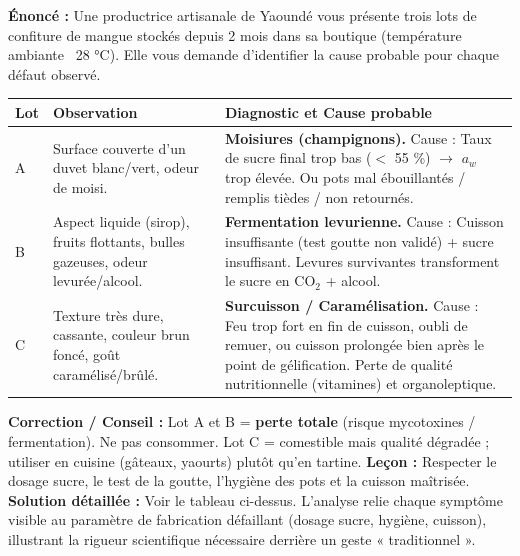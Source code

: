 \documentclass[11pt]{article}
\newcounter{popsec}
\newcounter{popsub}
\newcommand{\courssub}[1]{%
  \stepcounter{popsub}%
  \par\vspace{9pt}\noindent{\popxbold\fontsize{11.5}{13}\selectfont\color{popink}{\color{poporange}\thepopsec.\thepopsub}\hspace{6pt}#1}\par\nopagebreak\vspace{4pt}
}
\begin{document}
\begin{exoresolu}
\textbf{Énoncé :} Une productrice artisanale de Yaoundé vous présente trois lots de confiture de mangue stockés depuis 2 mois dans sa boutique (température ambiante ~28 °C). Elle vous demande d'identifier la cause probable pour chaque défaut observé.

\begin{center}
\begin{tabularx}{\linewidth}{|l|X|X|}\hline
\textbf{Lot} & \textbf{Observation} & \textbf{Diagnostic et Cause probable} \\ \hline
A & Surface couverte d'un duvet blanc/vert, odeur de moisi. & \textbf{Moisiures (champignons).} Cause : Taux de sucre final trop bas ($<$ 55 \%) $\rightarrow$ $a_w$ trop élevée. Ou pots mal ébouillantés / remplis tièdes / non retournés. \\ \hline
B & Aspect liquide (sirop), fruits flottants, bulles gazeuses, odeur levurée/alcool. & \textbf{Fermentation levurienne.} Cause : Cuisson insuffisante (test goutte non validé) + sucre insuffisant. Levures survivantes transforment le sucre en CO$_2$ + alcool. \\ \hline
C & Texture très dure, cassante, couleur brun foncé, goût caramélisé/brûlé. & \textbf{Surcuisson / Caramélisation.} Cause : Feu trop fort en fin de cuisson, oubli de remuer, ou cuisson prolongée bien après le point de gélification. Perte de qualité nutritionnelle (vitamines) et organoleptique. \\ \hline
\end{tabularx}
\end{center}

\textbf{Correction / Conseil :} Lot A et B = \textbf{perte totale} (risque mycotoxines / fermentation). Ne pas consommer. Lot C = comestible mais qualité dégradée ; utiliser en cuisine (gâteaux, yaourts) plutôt qu'en tartine. \textbf{Leçon :} Respecter le dosage sucre, le test de la goutte, l'hygiène des pots et la cuisson maîtrisée.
\tcblower
\textbf{Solution détaillée :}
Voir le tableau ci-dessus. L'analyse relie chaque symptôme visible au paramètre de fabrication défaillant (dosage sucre, hygiène, cuisson), illustrant la rigueur scientifique nécessaire derrière un geste « traditionnel ».
\end{exoresolu}

\courssub{Exercices d'entraînement}
\end{document}
